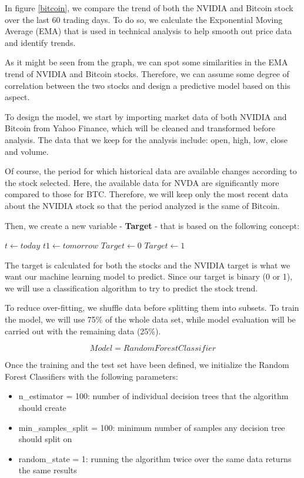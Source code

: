 \documentclass[conference,compsoc]{IEEEtran}
\begin{document}
In figure \ref{bitcoin}, we compare the trend of both the NVIDIA and Bitcoin stock over the last 60 trading days.
%
To do so, we calculate the Exponential Moving Average (EMA) that is used in technical analysis to help smooth out price data and identify trends.

As it might be seen from the graph, we can spot some similarities in the EMA trend of NVIDIA and Bitcoin stocks.
%
Therefore, we can assume some degree of correlation between the two stocks and design a predictive model based on this aspect.

To design the model, we start by importing market data of both NVIDIA and Bitcoin from Yahoo Finance, which will be cleaned and transformed before analysis.
%
The data that we keep for the analysis include: open, high, low, close and volume.

Of course, the period for which historical data are available changes according to the stock selected.
%
Here, the available data for NVDA are significantly more compared to those for BTC.
% 
Therefore, we will keep only the most recent data about the NVIDIA stock so that the period analyzed is the same of Bitcoin.

Then, we create a new variable - \textbf{Target} - that is based on the following concept:

\begin{algorithmic}
    \State $t \gets today$
    \State $t1 \gets tomorrow$
        \State $Target \gets 0$ 
    \Else
            \State $Target \gets 1$ 
        \EndIf
    \EndIf
\end{algorithmic}

The target is calculated for both the stocks and the NVIDIA target is what we want our machine learning model to predict.
%
Since our target is binary (0 or 1), we will use a classification algorithm to try to predict the stock trend.

To reduce over-fitting, we shuffle data before splitting them into subsets.
%
To train the model, we will use 75\% of the whole data set, while model evaluation will be carried out with the remaining data (25\%).

\[ Model = Random Forest Classifier \]

Once the training and the test set have been defined, we initialize the Random Forest Classifiers with the following parameters:

\begin{itemize}
    \item n\_estimator = 100: number of individual decision trees that the algorithm should create
    \item min\_samples\_split = 100: minimum number of samples any decision tree should split on
    \item random\_state = 1: running the algorithm twice over the same data returns the same results
\end{itemize}
\end{document}
